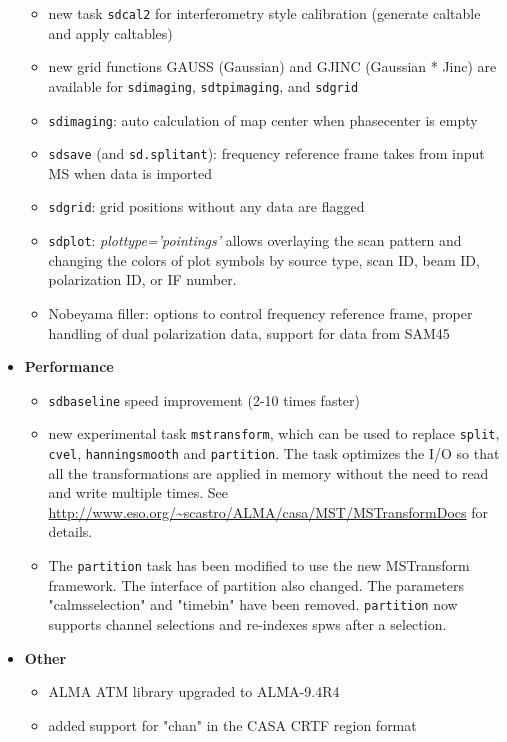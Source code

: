 \begin{itemize}
\begin{itemize}
 \item  new task {\tt sdcal2} for interferometry style calibration (generate caltable and apply caltables)
  \item  new grid functions GAUSS (Gaussian) and GJINC (Gaussian * Jinc) are available for {\tt sdimaging}, {\tt sdtpimaging}, and {\tt sdgrid}
   \item  {\tt sdimaging}: auto calculation of map center when phasecenter is empty
   \item  {\tt sdsave} (and {\tt sd.splitant}): frequency reference frame takes from input MS when data is imported
   \item  {\tt sdgrid}: grid positions without any data are flagged
   \item  {\tt sdplot}: {\it plottype='pointings'} allows overlaying
  the scan pattern and changing the colors of plot symbols by source
  type, scan ID, beam ID, polarization ID, or IF number.
  \item  Nobeyama filler: options to control frequency reference frame,
  proper handling of dual polarization data, support for data from SAM45
 
 
\end{itemize}


\item {\bf Performance}
 
\begin{itemize}
  \item  {\tt sdbaseline} speed improvement (2-10 times faster)
  
  \item new experimental task {\tt mstransform}, which can be used to
  replace {\tt split}, {\tt cvel}, {\tt hanningsmooth} and
  {\tt partition}. The task optimizes the I/O so that all the transformations are applied in memory without the need to read and
write multiple times. See
  \url{http://www.eso.org/~scastro/ALMA/casa/MST/MSTransformDocs}
  for details.
  \item  The {\tt partition} task has been modified to use the new
  MSTransform framework. The interface of partition also changed. The
  parameters "calmsselection" and "timebin" have been
  removed. {\tt partition} now supports channel selections and
  re-indexes spws after a selection.
\end{itemize}

\item {\bf Other}
\begin{itemize}
    \item  ALMA ATM library upgraded to ALMA-9.4R4
    \item  added support for "chan" in the CASA CRTF region format
    

\end{itemize}
\end{itemize}





